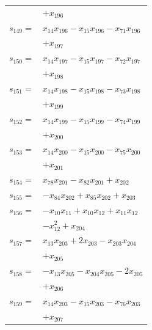 \begin{longtable}{@{}r@{\;}l@{}}
 & \(\displaystyle +x_{196}\) \\[3pt]
\(s_{149}=\) & \(\displaystyle x_{14}x_{196} -x_{15}x_{196} -x_{71}x_{196}\) \\
 & \(\displaystyle +x_{197}\) \\[3pt]
\(s_{150}=\) & \(\displaystyle x_{14}x_{197} -x_{15}x_{197} -x_{72}x_{197}\) \\
 & \(\displaystyle +x_{198}\) \\[3pt]
\(s_{151}=\) & \(\displaystyle x_{14}x_{198} -x_{15}x_{198} -x_{73}x_{198}\) \\
 & \(\displaystyle +x_{199}\) \\[3pt]
\(s_{152}=\) & \(\displaystyle x_{14}x_{199} -x_{15}x_{199} -x_{74}x_{199}\) \\
 & \(\displaystyle +x_{200}\) \\[3pt]
\(s_{153}=\) & \(\displaystyle x_{14}x_{200} -x_{15}x_{200} -x_{75}x_{200}\) \\
 & \(\displaystyle +x_{201}\) \\[3pt]
\(s_{154}=\) & \(\displaystyle x_{78}x_{201} -x_{82}x_{201} +x_{202}\) \\[3pt]
\(s_{155}=\) & \(\displaystyle -x_{84}x_{202} +x_{85}x_{202} +x_{203}\) \\[3pt]
\(s_{156}=\) & \(\displaystyle -x_{10}x_{11} +x_{10}x_{12} +x_{11}x_{12}\) \\
 & \(\displaystyle -x_{12}^{2} +x_{204}\) \\[3pt]
\(s_{157}=\) & \(\displaystyle x_{13}x_{203} +2x_{203} -x_{203}x_{204}\) \\
 & \(\displaystyle +x_{205}\) \\[3pt]
\(s_{158}=\) & \(\displaystyle -x_{13}x_{205} -x_{204}x_{205} -2x_{205}\) \\
 & \(\displaystyle +x_{206}\) \\[3pt]
\(s_{159}=\) & \(\displaystyle x_{14}x_{203} -x_{15}x_{203} -x_{76}x_{203}\) \\
 & \(\displaystyle +x_{207}\) \\[3pt]
\end{longtable}
\endgroup
